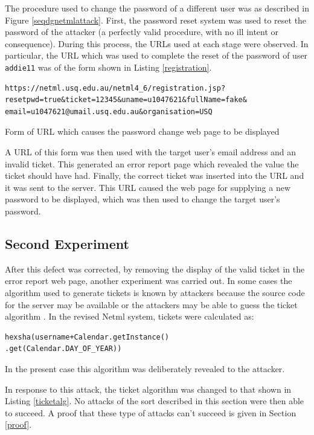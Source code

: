 The procedure used to change the password of a different user was as
described in Figure \ref{seqdgnetmlattack}. First, the password reset system was used to reset the password
of the attacker (a perfectly valid procedure, with no ill intent or 
consequence). During this process, the URLs used at each stage
were observed. In particular, the URL which was used to complete
the reset of the password of user \verb|addie11| was of the form
shown in Listing \ref{registration}.
\begin{listing}{\scriptsize
\begin{verbatim}
https://netml.usq.edu.au/netml4_6/registration.jsp?
resetpwd=true&ticket=12345&uname=u1047621&fullName=fake&
email=u1047621@umail.usq.edu.au&organisation=USQ
\end{verbatim}
}
\caption{Form of URL which causes the password change web page to be displayed}
\label{registration}
\end{listing}
A URL of this form was then used with the target user's email address and 
an invalid ticket. This generated an error report page which revealed
the value the ticket should have had. Finally, the correct ticket was
inserted into the URL and it was sent to the server. This URL caused
the web page for supplying a new password to be displayed, which was then
used to change the target user's password.

\subsection{Second Experiment}
After this defect was corrected, by removing the display of the valid
ticket in the error report web page, 
another experiment was carried out.
In some cases the algorithm used to generate tickets is known by attackers
because the source code for the server may be available or the attackers
may be able to guess the ticket algorithm
\cite{wang2018end}. In the revised Netml system, tickets were calculated as:
\begin{verbatim}
hexsha(username+Calendar.getInstance()
.get(Calendar.DAY_OF_YEAR))
\end{verbatim}
In the present case this algorithm was deliberately revealed to the attacker.

In response to this attack, the ticket algorithm was changed to that 
shown in Listing \ref{ticketalg}. No attacks of the sort
described in this section were then able to succeed. A proof that
these type of attacks can't succeed is given in Section \ref{proof}.


